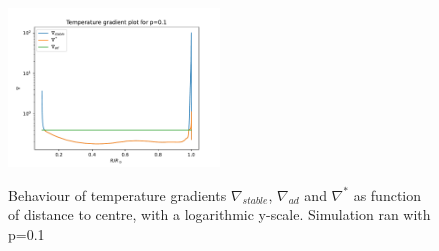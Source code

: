 \documentclass[10pt, nofootinbib, twocolumn]{revtex4-1}
\begin{document}
\begin{figure}[H]
    \caption{Behaviour of temperature gradients $\nabla_{stable}$, $\nabla_{ad}$ and $\nabla^*$ as function of distance to centre, with a logarithmic y-scale. Simulation ran with p=0.1}
    \centering
    \includegraphics[width = 0.5\textwidth]{Figures/TemperatureGradients_sanity_check.pdf} 
    \label{fig_:sanity_grad}
\end{figure} 



\newpage
\end{document}
